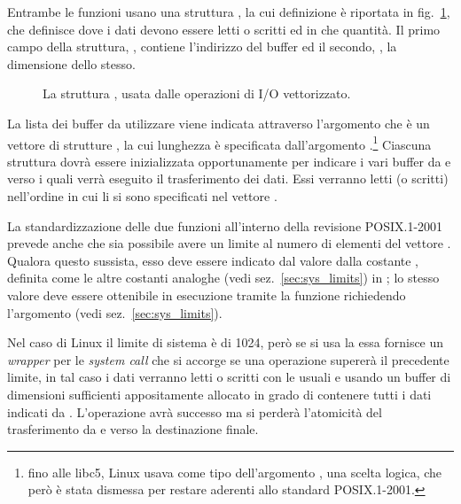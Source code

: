 Entrambe le funzioni usano una struttura , la cui definizione è
riportata in fig.~\ref{fig:file_iovec}, che definisce dove i dati devono
essere letti o scritti ed in che quantità. Il primo campo della struttura,
, contiene l'indirizzo del buffer ed il secondo,
, la dimensione dello stesso.

\begin{figure}[!htb]
  \footnotesize \centering
  \begin{minipage}[c]{\textwidth}
  \end{minipage} 
  \normalsize 
  \caption{La struttura , usata dalle operazioni di I/O
    vettorizzato.} 
  \label{fig:file_iovec}
\end{figure}

La lista dei buffer da utilizzare viene indicata attraverso l'argomento
 che è un vettore di strutture , la cui lunghezza
è specificata dall'argomento .\footnote{fino alle libc5, Linux
  usava  come tipo dell'argomento , una scelta
  logica, che però è stata dismessa per restare aderenti allo standard
  POSIX.1-2001.}  Ciascuna struttura dovrà essere inizializzata opportunamente
per indicare i vari buffer da e verso i quali verrà eseguito il trasferimento
dei dati. Essi verranno letti (o scritti) nell'ordine in cui li si sono
specificati nel vettore .

La standardizzazione delle due funzioni all'interno della revisione
POSIX.1-2001 prevede anche che sia possibile avere un limite al numero di
elementi del vettore . Qualora questo sussista, esso deve essere
indicato dal valore dalla costante , definita come le altre
costanti analoghe (vedi sez.~\ref{sec:sys_limits}) in ; lo
stesso valore deve essere ottenibile in esecuzione tramite la funzione
 richiedendo l'argomento  (vedi
sez.~\ref{sec:sys_limits}).

Nel caso di Linux il limite di sistema è di 1024, però se si usa la
 essa fornisce un \textit{wrapper} per le \textit{system call}
che si accorge se una operazione supererà il precedente limite, in tal caso i
dati verranno letti o scritti con le usuali  e  usando
un buffer di dimensioni sufficienti appositamente allocato in grado di
contenere tutti i dati indicati da . L'operazione avrà successo
ma si perderà l'atomicità del trasferimento da e verso la destinazione finale.

